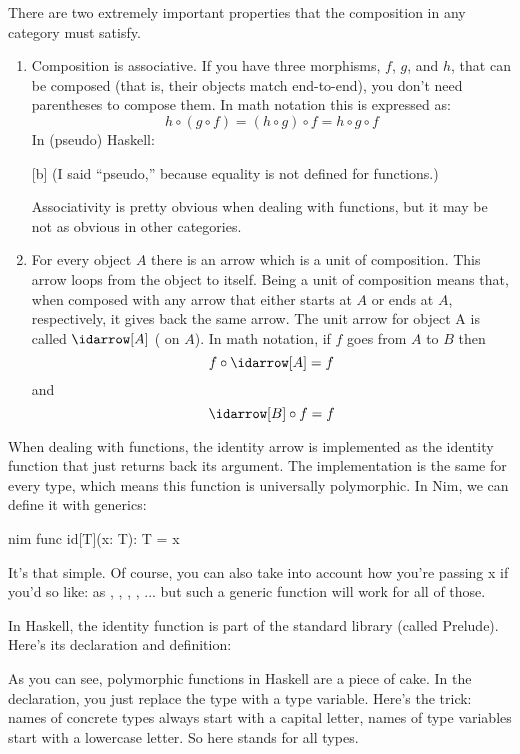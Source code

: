 There are two extremely important properties that the composition in any
category must satisfy.

\begin{enumerate}
  \item
        Composition is associative. If you have three morphisms, $f$, $g$, and $h$,
        that can be composed (that is, their objects match end-to-end), you
        don't need parentheses to compose them. In math notation this is
        expressed as:
        \[h \circ (g \circ f) = (h \circ g) \circ f = h \circ g \circ f\]
        In (pseudo) Haskell:

        [b]
        (I said ``pseudo,'' because equality is not defined for functions.)

        Associativity is pretty obvious when dealing with functions, but it may
        be not as obvious in other categories.

  \item
        For every object $A$ there is an arrow which is a unit of composition.
        This arrow loops from the object to itself. Being a unit of composition
        means that, when composed with any arrow that either starts at $A$ or ends
        at $A$, respectively, it gives back the same arrow. The unit arrow for
        object A is called $\idarrow[A]$ ( on $A$). In math
        notation, if $f$ goes from $A$ to $B$ then
        \[f \circ \idarrow[A] = f\]
        and
        \[\idarrow[B] \circ f = f\]
\end{enumerate}
When dealing with functions, the identity arrow is implemented as the
identity function that just returns back its argument. The
implementation is the same for every type, which means this function is
universally polymorphic. In Nim, we can define it with generics:

\begin{snip}{nim}
func id[T](x: T): T = x
\end{snip}
It's that simple. Of course, you can also take into account how you're passing
x if you'd so like: as , , , ,
... but such a generic function will work for all of those.

In Haskell, the identity function is part of the standard library
(called Prelude). Here's its declaration and definition:

As you can see, polymorphic functions in Haskell are a piece of cake. In
the declaration, you just replace the type with a type variable. Here's
the trick: names of concrete types always start with a capital letter,
names of type variables start with a lowercase letter. So here
 stands for all types.

